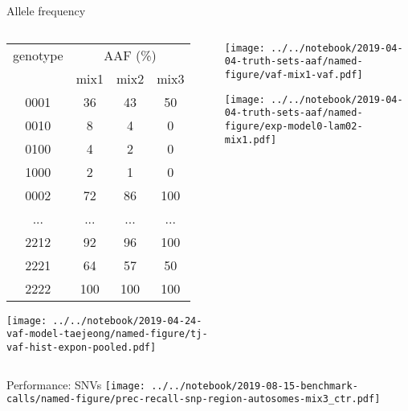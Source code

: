 \documentclass{beamer}
\begin{document}
\begin{frame}{Allele frequency}
\begin{columns}[t]
\begin{column}{0.5\textwidth}

{\tiny
\begin{tabular}{c|ccc}
genotype & \multicolumn{3}{c}{AAF (\%)} \\
& mix1 &  mix2 & mix3 \\
\hline
0001 & 36 & 43 & 50\\
0010 & 8 & 4 & 0\\
0100 & 4 & 2 & 0\\
1000 & 2 & 1 & 0\\
0002 & 72 & 86 & 100\\
... & ... & ... & ...\\
2212 & 92 & 96 & 100\\
2221 & 64 & 57 & 50\\
2222 & 100 & 100 & 100\\
\end{tabular}
}

\texttt{[image: ../../notebook/2019-04-24-vaf-model-taejeong/named-figure/tj-vaf-hist-expon-pooled.pdf]}

\end{column}

\begin{column}{0.5\textwidth}

\texttt{[image: ../../notebook/2019-04-04-truth-sets-aaf/named-figure/vaf-mix1-vaf.pdf]}

\texttt{[image: ../../notebook/2019-04-04-truth-sets-aaf/named-figure/exp-model0-lam02-mix1.pdf]}
\end{column}
\end{columns}
\end{frame}

\begin{frame}{Performance: SNVs}
\texttt{[image: ../../notebook/2019-08-15-benchmark-calls/named-figure/prec-recall-snp-region-autosomes-mix3\_ctr.pdf]}
\end{frame}
\end{document}
